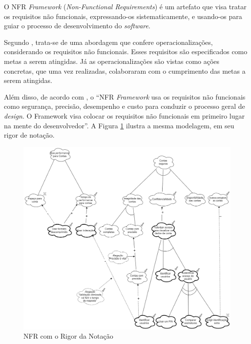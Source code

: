 \label{sec:nfr}

O NFR \textit{Framework} (\textit{Non-Functional Requirements}) é um artefato que visa tratar os requisitos não funcionais, expressando-os sistematicamente, e usando-os para guiar o processo de desenvolvimento do \textit{software}.

Segundo \cite{coutoproposta}, trata-se de uma abordagem que confere operacionalizações, considerando os requisitos não funcionais. Esses requisitos são especificados como metas a serem atingidas. Já as operacionalizações são vistas como ações concretas, que uma vez realizadas, colaboraram com o cumprimento das metas a serem atingidas.

Além disso, de acordo com \cite{chung2012non}, o “NFR \textit{Framework} usa os requisitos não funcionais como segurança, precisão, desempenho e custo para conduzir o processo geral de \textit{design}. O Framework visa colocar os requisitos não funcionais em primeiro lugar na mente do desenvolvedor”. A Figura \ref{fig:nfr_original} ilustra a mesma modelagem, em seu rigor de notação.

\begin{figure}[H]
    \begin{center}
        \caption{NFR com o Rigor da Notação}
        \label{fig:nfr_original}
        \includegraphics[scale=0.41]{figuras/Embasamento/nfr_rigor_v2.png}
    \end{center}
\end{figure}


